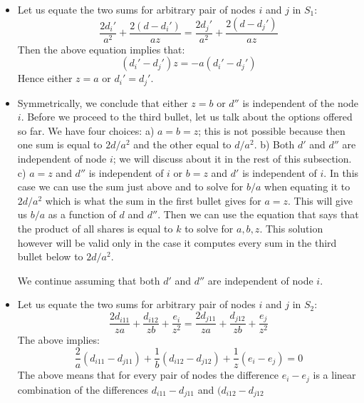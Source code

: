 \begin{itemize}
\item Let us equate the two sums for arbitrary pair of nodes $i$ and $j$ in $S_1$:
$$\frac{2d_i'}{a^2}+\frac{2 (d-d_i')}{az}=\frac{2d_j'}{a^2}+\frac{2 (d-d_j')}{az}$$
Then the above equation implies that:
$$(d_i'-d_j')z=-a(d_i'-d_j')$$
Hence either $z=a$ or $d_i'=d_j'$.
\item Symmetrically, we conclude that either $z=b$ or $d''$
is independent of the node $i$.
Before we proceed to the third bullet, let us talk about the options offered so far.
We have four choices: a) $a=b=z$; this is not possible because then one sum is
equal to $2d/a^2$ and the other equal to $d/a^2$. b) Both $d'$ and $d''$ are independent
of node $i$; we will discuss about it in the rest of this subsection. c) $a=z$ and $d''$ is
independent of $i$ or $b=z$ and $d'$ is independent of $i$. In this case we can use
the sum just above and to solve for $b/a$ when equating it to $2d/a^2$ which is
what the sum in the first bullet gives for $a=z$. This will give us $b/a$ as a
function of $d$ and $d''$. Then we can use the equation that says that the
product of all shares is equal to $k$ to solve for $a,b,z$. This solution however
will be valid only in the case it computes every sum in the third bullet
below to $2d/a^2$.

We continue assuming that both $d'$ and $d''$ are independent
of node $i$.
\item Let us equate the two sums for arbitrary pair of nodes $i$ and $j$  in $S_2$:
$$\frac{2d_{i11}}{za}+ \frac{d_{i12}}{zb}+ \frac{e_i}{z^2}=
\frac{2d_{j11}}{za}+ \frac{d_{j12}}{zb}+ \frac{e_j}{z^2}$$
The above implies:
$$\frac{2}{a}(d_{i11}-d_{j11}) + \frac{1}{b}(d_{i12}-d_{j12}) +\frac{1}{z}(e_i-e_j)=0$$
The above means that for every pair of nodes the difference $e_i-e_j$ is a linear
combination of the differences $d_{i11}-d_{j11}$ and $(d_{i12}-d_{j12}$
\end{itemize}

